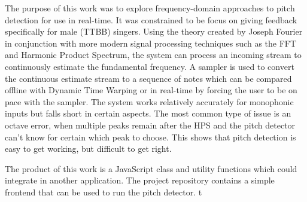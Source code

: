 The purpose of this work was to explore frequency-domain approaches to pitch detection for use in real-time. It was constrained to be focus on giving feedback specifically for male (TTBB) singers. Using the theory created by Joseph Fourier in conjunction with more modern signal processing techniques such as the FFT and Harmonic Product Spectrum, the system can process an incoming stream to continuously estimate the fundamental frequency. A sampler is used to convert the continuous estimate stream to a sequence of notes which can be compared offline with Dynamic Time Warping or in real-time by forcing the user to be on pace with the sampler. The system works relatively accurately for monophonic inputs but falls short in certain aspects. The most common type of issue is an octave error, when multiple peaks remain after the HPS and the pitch detector can't know for certain which peak to choose. This shows that pitch detection is easy to get working, but difficult to get right. 

The product of this work is a JavaScript class and utility functions which could integrate in another application. The project repository contains a simple frontend that can be used to run the pitch detector.  
t